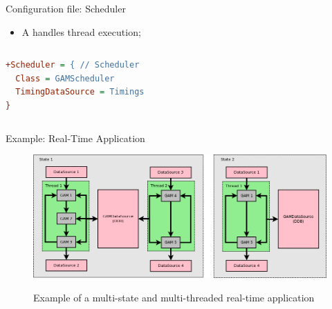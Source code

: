 \begin{frame}[fragile]{Configuration file: Scheduler}
	\begin{itemize}
		\item A  handles thread execution;
	\end{itemize}
	\vspace{1cm}
	\begin{columns}
		\begin{lstlisting}[style=normal, language=cfg]
+Scheduler = { // Scheduler
  Class = GAMScheduler
  TimingDataSource = Timings
}\end{lstlisting}
	\end{columns}
\end{frame}

\begin{frame}{Example: Real-Time Application}
	\begin{figure}
		\centering
		\includegraphics[width=\textwidth]{RTApp.png}
		\label{fig:rtapp_example}
		\caption{Example of a multi-state and multi-threaded real-time application}
	\end{figure}
\end{frame}
